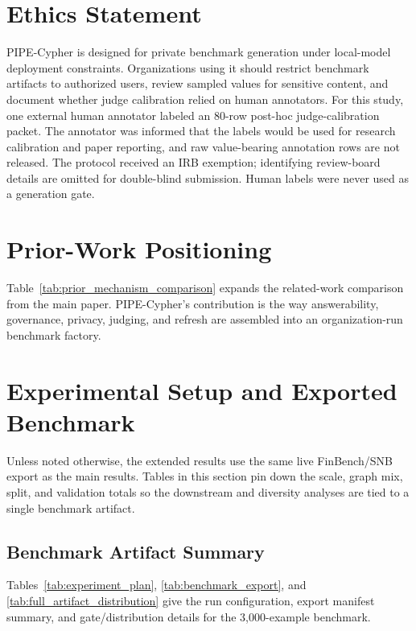 \documentclass[11pt]{article}
\begin{document}
\section*{Ethics Statement}
PIPE-Cypher is designed for private benchmark generation under local-model deployment constraints. Organizations using it should restrict benchmark artifacts to authorized users, review sampled values for sensitive content, and document whether judge calibration relied on human annotators. For this study, one external human annotator labeled an 80-row post-hoc judge-calibration packet. The annotator was informed that the labels would be used for research calibration and paper reporting, and raw value-bearing annotation rows are not released. The protocol received an IRB exemption; identifying review-board details are omitted for double-blind submission. Human labels were never used as a generation gate.



\clearpage
\appendix
\raggedbottom

\section{Prior-Work Positioning}

Table~\ref{tab:prior_mechanism_comparison} expands the related-work comparison from the main paper. PIPE-Cypher's contribution is the way answerability, governance, privacy, judging, and refresh are assembled into an organization-run benchmark factory.



\section{Experimental Setup and Exported Benchmark}

Unless noted otherwise, the extended results use the same live FinBench/SNB export as the main results. Tables in this section pin down the scale, graph mix, split, and validation totals so the downstream and diversity analyses are tied to a single benchmark artifact.

\subsection{Benchmark Artifact Summary}

Tables~\ref{tab:experiment_plan}, \ref{tab:benchmark_export}, and \ref{tab:full_artifact_distribution} give the run configuration, export manifest summary, and gate/distribution details for the 3,000-example benchmark.
\end{document}
